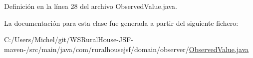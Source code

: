 Definición en la línea 28 del archivo Observed\+Value.\+java.



La documentación para esta clase fue generada a partir del siguiente fichero\+:\begin{DoxyCompactItemize}
\item 
C\+:/\+Users/\+Michel/git/\+W\+S\+Rural\+House-\/\+J\+S\+F-\/maven-\//src/main/java/com/ruralhousejsf/domain/observer/\mbox{\hyperlink{_observed_value_8java}{Observed\+Value.\+java}}\end{DoxyCompactItemize}
